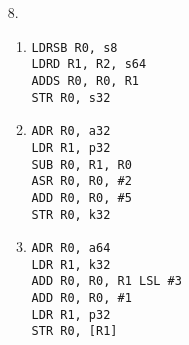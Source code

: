 \documentclass{article}
\begin{document}
\begin{enumerate}
\begin{multicols}{2}
\begin{enumerate}
            \item
                \texttt{ADR R0, u16}    \\
                \texttt{ADD R0, R0, \#1} \\
                \texttt{STR R0, p16}   \\
            \item
                \texttt{LDR R0, p16}    \\
                \texttt{LDRH R1, [R0]}  \\
                \texttt{ADD R1, R1, \#1}\\
                \texttt{STRH R1, [R0]}  \\  
        \end{enumerate}
        \end{multicols}
        
    \item[8.]
        \begin{multicols}{2}
        \begin{enumerate}
            \item
                \texttt{LDRSB R0, s8}    \\
                \texttt{LDRD R1, R2, s64}\\
                \texttt{ADDS R0, R0, R1} \\
                \texttt{STR R0, s32}     \\
            \item
                \texttt{ADR R0, a32}    \\
                \texttt{LDR R1, p32}    \\
                \texttt{SUB R0, R1, R0} \\
                \texttt{ASR R0, R0, \#2} \\
                \texttt{ADD R0, R0, \#5}\\
                \texttt{STR R0, k32}    \\
            
            \item
                \texttt{ADR R0, a64}\\
                \texttt{LDR R1, k32}\\
                \texttt{ADD R0, R0, R1 LSL \#3}\\
                \texttt{ADD R0, R0, \#1}\\
                \texttt{LDR R1, p32}\\
                \texttt{STR R0, [R1]}\\


\end{enumerate}
\end{multicols}
\end{enumerate}
\end{document}
